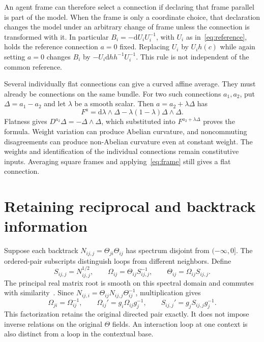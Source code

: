 \documentclass[11pt]{article}
\newcommand{\dd}{\mathrm d}
\begin{document}
An agent frame can therefore select a connection if declaring that frame parallel is part of the model. When the frame is only a coordinate choice, that declaration changes the model under an arbitrary change of frame unless the connection is transformed with it. In particular $B_i=-\dd U_iU_i^{-1}$, with $U_i$ as in~\eqref{eq:reference}, holds the reference connection $a=0$ fixed. Replacing $U_i$ by $U_i h(c)$ while again setting $a=0$ changes $B_i$ by $-U_i\dd h h^{-1}U_i^{-1}$. This rule is not independent of the common reference.

Several individually flat connections can give a curved affine average. They must already be connections on the same bundle. For two such connections $a_1,a_2$, put $\Delta=a_1-a_2$ and let $\lambda$ be a smooth scalar. Then $a=a_2+\lambda\Delta$ has
\begin{equation}
 F^a=\dd\lambda\wedge\Delta-\lambda(1-\lambda)\Delta\wedge\Delta.
 \label{eq:average-curvature}
\end{equation}
Flatness gives $D^{a_2}\Delta=-\Delta\wedge\Delta$, which substituted into $F^{a_2+\lambda\Delta}$ proves the formula. Weight variation can produce Abelian curvature, and noncommuting disagreements can produce non-Abelian curvature even at constant weight. The weights and identification of the individual connections remain constitutive inputs. Averaging square frames and applying~\eqref{eq:frame} still gives a flat connection.

\section{Retaining reciprocal and backtrack information}

Suppose each backtrack $N_{ij,j}=\Theta_{ji}\Theta_{ij}$ has spectrum disjoint from $(-\infty,0]$. The ordered-pair subscripts distinguish loops from different neighbors. Define
\begin{equation}
 S_{ij,j}=N_{ij,j}^{1/2},\qquad
 \Omega_{ij}=\Theta_{ij}S_{ij,j}^{-1},\qquad
 \Theta_{ij}=\Omega_{ij}S_{ij,j}.
 \label{eq:reciprocal}
\end{equation}
The principal real matrix root is smooth on this spectral domain and commutes with similarity~\cite{Higham2008}. Since $N_{ij,i}=\Theta_{ij}N_{ij,j}\Theta_{ij}^{-1}$, multiplication gives
\begin{equation}
 \Omega_{ji}=\Omega_{ij}^{-1},\qquad
 \Omega_{ij}'=g_i\Omega_{ij}g_j^{-1},\qquad
 S_{ij,j}'=g_jS_{ij,j}g_j^{-1}.
 \label{eq:reciprocal-law}
\end{equation}
This factorization retains the original directed pair exactly. It does not impose inverse relations on the original $\Theta$ fields. An interaction loop at one context is also distinct from a loop in the contextual base.
\end{document}
